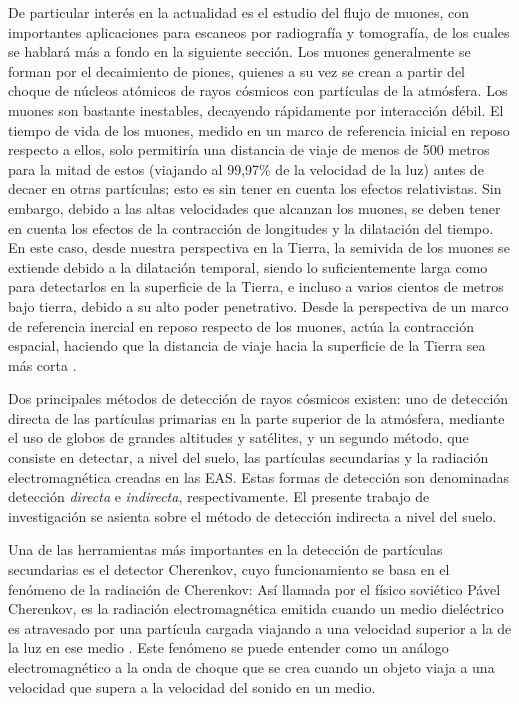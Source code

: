 \documentclass[12pt]{report}
\begin{document}
De particular interés en la actualidad es el estudio del flujo de muones, con importantes aplicaciones para escaneos por radiografía y tomografía, de los cuales se hablará más a fondo en la siguiente sección. Los muones generalmente se forman por el decaimiento de piones, quienes a su vez se crean a partir del choque de núcleos atómicos de rayos cósmicos con partículas de la atmósfera. Los muones son bastante inestables, decayendo rápidamente por interacción débil. El tiempo de vida de los muones, medido en un marco de referencia inicial en reposo respecto a ellos, solo permitiría una distancia de viaje de menos de 500 metros para la mitad de estos (viajando al 99,97\% de la velocidad de la luz) antes de decaer en otras partículas; esto es sin tener en cuenta los efectos relativistas. Sin embargo, debido a las altas velocidades que alcanzan los muones, se deben tener en cuenta los efectos de la contracción de longitudes y la dilatación del tiempo. En este caso, desde nuestra perspectiva en la Tierra, la semivida de los muones se extiende debido a la dilatación temporal, siendo lo suficientemente larga como para detectarlos en la superficie de la Tierra, e incluso a varios cientos de metros bajo tierra, debido a su alto poder penetrativo. Desde la perspectiva de un marco de referencia inercial en reposo respecto de los muones, actúa la contracción espacial, haciendo que la distancia de viaje hacia la superficie de la Tierra sea más corta \cite{cunningham2019high}.

Dos principales métodos de detección de rayos cósmicos existen: uno de detección directa de las partículas primarias en la parte superior de la atmósfera, mediante el uso de globos de grandes altitudes y satélites, y un segundo método, que consiste en detectar, a nivel del suelo, las partículas secundarias y la radiación electromagnética creadas en las EAS. Estas formas de detección son denominadas detección \textit{directa} e \textit{indirecta}, respectivamente. El presente trabajo de investigación se asienta sobre el método de detección indirecta a nivel del suelo.

Una de las herramientas más importantes en la detección de partículas secundarias es el detector Cherenkov, cuyo funcionamiento se basa en el fenómeno de la radiación de Cherenkov: Así llamada por el físico soviético Pável Cherenkov, es la radiación electromagnética emitida cuando un medio dieléctrico es atravesado por una partícula cargada viajando a una velocidad superior a la de la luz en ese medio \cite{jelley1955cerenkov}. Este fenómeno se puede entender como un análogo electromagnético a la onda de choque que se crea cuando un objeto viaja a una velocidad que supera a la velocidad del sonido en un medio.
\end{document}

